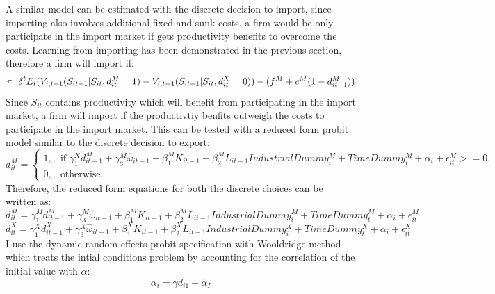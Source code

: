 \documentclass[11pt]{article}
\begin{document}
A similar model can be estimated with the discrete decision to import,
since importing also involves additional fixed and sunk costs, a firm
would be only participate in the import market if gets productivity
benefits to overcome the costs. Learning-from-importing has been
demonstrated in the previous section, therefore a firm will import if:
\begin{equation}
\begin{equation}
\pi^  +
\delta^{t}E_{t}(V_{i,t+1}(S_{it+1}|S_{it},d_{it}^{M}=1) -
V_{i,t+1}(S_{it+1}|S_{it},d_{it}^{X}=0) ) -  (f^{M} + c^{M}(1-d_{it-1}^{M}))
\end{equation}
Since $S_{it}$ contains productivity which will benefit from
participating in the import market, a firm will import if the
productivtiy benfits outweigh the costs to participate in the import
market. This can be tested with a reduced form probit model similar to
the discrete decision to export: 
\begin{equation}
  d_{it}^{M}=\begin{cases}
   1 , & \text{if $\gamma_{1}^{X} d_{it-1}^{M} + 
\gamma_{3}^{M} \hat{\omega}_{it-1}  + \beta_{1}^{M}K_{it-1}  +\beta_{2}^{M}L_{it-1}
IndustrialDummy_{i}^{M} + TimeDummy_{t}^{M}  + \alpha_{i}+\epsilon_{it}^{M}>= 0   $}.\\
   0 , & \text{otherwise}.
  \end{cases}
\end{equation}
Therefore, the reduced form equations for both the discrete choices
can be written as:
\begin{equation}
d_{it}^{M} = \gamma_{1}^{M} d_{it-1}^{M} + 
\gamma_{3}^{M} \hat{\omega}_{it-1}  + \beta_{1}^{M}K_{it-1}  +\beta_{2}^{M}L_{it-1}
IndustrialDummy_{i}^{M} + TimeDummy_{t}^{M}  + \alpha_{i}+\epsilon_{it}^{M}
\end{equation}
\begin{equation}
d_{it}^{X} = \gamma_{1}^{X} d_{it-1}^{X} + 
\gamma_{3}^{X} \hat{\omega}_{it-1}  + \beta_{1}^{X}K_{it-1}  +\beta_{2}^{X}L_{it-1}
IndustrialDummy_{i}^{X} + TimeDummy_{t}^{X}  + \alpha_{i}+\epsilon_{it}^{X}
\end{equation}
I use the dynamic random effects probit specification with Wooldridge
method which treats the intial conditions problem by accounting for
the correlation of the initial value with $\alpha$:
$$  \alpha_{i}= \gamma d_{i1}+ \tilde{\alpha_{I}} $$
\end{document}
